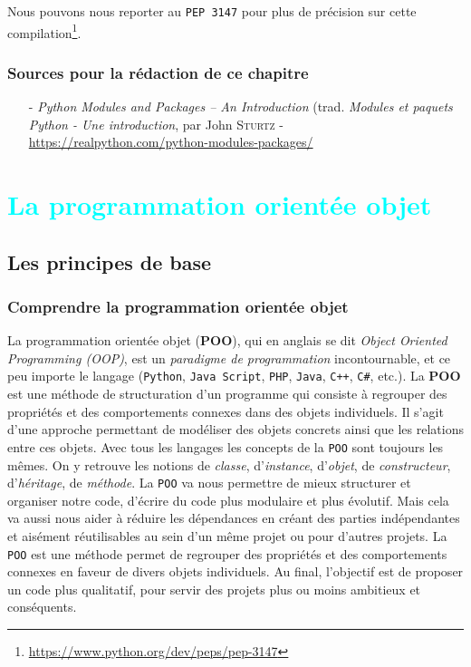 \documentclass[a4paper,11pt]{book}
\begin{document}
Nous pouvons nous reporter au \texttt{PEP 3147} pour plus de précision sur cette compilation\footnote{\url{https://www.python.org/dev/peps/pep-3147}}.
\medskip

\section*{Sources pour la rédaction de ce chapitre}
\begin{itemize}
	\item[-] \textit{Python Modules and Packages – An Introduction} (trad. \textit{Modules et paquets Python - Une introduction}, par John \textsc{Sturtz} - \url{https://realpython.com/python-modules-packages/}
\end{itemize}
\medskip

\part{\textcolor{cyan}{La programmation orientée objet}}
\chapter{Les principes de base}\label{POO}
\section{Comprendre la programmation orientée objet}
La programmation orientée objet (\textbf{POO}), qui en anglais se dit \textit{Object Oriented Programming (OOP)}, est un \textit{paradigme de programmation} incontournable, et ce peu importe le langage (\texttt{Python}, \texttt{Java Script}, \texttt{PHP}, \texttt{Java}, \texttt{C++}, \texttt{C\#}, etc.). La \textbf{POO} est une méthode de structuration d'un programme qui consiste à regrouper des propriétés et des comportements connexes dans des objets individuels. Il s'agit d'une approche permettant de modéliser des objets concrets ainsi que les relations entre ces objets. Avec tous les langages les concepts de la \texttt{POO} sont toujours les mêmes. On y retrouve les notions de \textit{classe}, d'\textit{instance}, d'\textit{objet}, de \textit{constructeur}, d'\textit{héritage}, de \textit{méthode}. La \texttt{POO} va nous permettre de mieux structurer et organiser notre code, d'écrire du code plus modulaire et plus évolutif. Mais cela va aussi nous aider à réduire les dépendances en créant des parties indépendantes et aisément réutilisables au sein d'un même projet ou pour d'autres projets. La \texttt{POO} est une méthode permet de regrouper des propriétés et des comportements connexes en faveur de divers objets individuels. Au final, l'objectif est de proposer un code plus qualitatif, pour servir des projets plus ou moins ambitieux et conséquents.
\medskip
\end{document}
